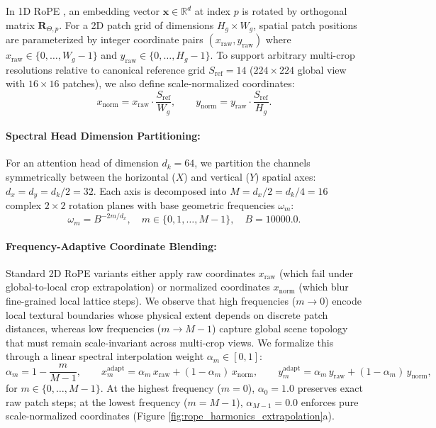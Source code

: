 \documentclass[11pt,a4paper]{article}
\begin{document}
In 1D RoPE \cite{su2024roformer}, an embedding vector $\mathbf{x} \in \mathbb{R}^d$ at index $p$ is rotated by orthogonal matrix $\mathbf{R}_{\Theta, p}$. For a 2D patch grid of dimensions $H_g \times W_g$, spatial patch positions are parameterized by integer coordinate pairs $(x_{\text{raw}}, y_{\text{raw}})$ where $x_{\text{raw}} \in \{0, \dots, W_g-1\}$ and $y_{\text{raw}} \in \{0, \dots, H_g-1\}$. To support arbitrary multi-crop resolutions relative to canonical reference grid $S_{\text{ref}} = 14$ ($224\times 224$ global view with $16\times 16$ patches), we also define scale-normalized coordinates:
\begin{equation}
x_{\text{norm}} = x_{\text{raw}} \cdot \frac{S_{\text{ref}}}{W_g}, \qquad y_{\text{norm}} = y_{\text{raw}} \cdot \frac{S_{\text{ref}}}{H_g}.
\label{eq:norm_coords}
\end{equation}

\paragraph{Spectral Head Dimension Partitioning:} For an attention head of dimension $d_k = 64$, we partition the channels symmetrically between the horizontal ($X$) and vertical ($Y$) spatial axes: $d_x = d_y = d_k / 2 = 32$. Each axis is decomposed into $M = d_x / 2 = d_k / 4 = 16$ complex $2\times 2$ rotation planes with base geometric frequencies $\omega_m$:
\begin{equation}
\omega_m = B^{-2m / d_x}, \quad m \in \{0, 1, \dots, M-1\}, \quad B = 10000.0.
\label{eq:frequencies}
\end{equation}

\paragraph{Frequency-Adaptive Coordinate Blending:} Standard 2D RoPE variants either apply raw coordinates $x_{\text{raw}}$ (which fail under global-to-local crop extrapolation) or normalized coordinates $x_{\text{norm}}$ (which blur fine-grained local lattice steps). We observe that high frequencies ($m \to 0$) encode local textural boundaries whose physical extent depends on discrete patch distances, whereas low frequencies ($m \to M-1$) capture global scene topology that must remain scale-invariant across multi-crop views. We formalize this through a linear spectral interpolation weight $\alpha_m \in [0, 1]$:
\begin{equation}
\alpha_m = 1 - \frac{m}{M - 1}, \qquad x_m^{\text{adapt}} = \alpha_m \, x_{\text{raw}} + (1 - \alpha_m) \, x_{\text{norm}}, \qquad y_m^{\text{adapt}} = \alpha_m \, y_{\text{raw}} + (1 - \alpha_m) \, y_{\text{norm}},
\label{eq:coord_blend}
\end{equation}
for $m \in \{0, \dots, M-1\}$. At the highest frequency ($m=0$), $\alpha_0 = 1.0$ preserves exact raw patch steps; at the lowest frequency ($m=M-1$), $\alpha_{M-1} = 0.0$ enforces pure scale-normalized coordinates (Figure \ref{fig:rope_harmonics_extrapolation}a).
\end{document}
